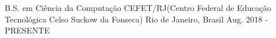 

\begin{cventries}

  \cventry
    {B.S. em Ciência da Computação} %
    {CEFET/RJ(Centro Federal de Educação Tecnológica Celso Suckow da Fonseca)} %
    {Rio de Janeiro, Brasil} %
    {Aug. 2018 - PRESENTE} %
    {}
\end{cventries}
